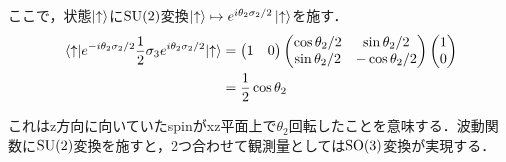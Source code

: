 ここで，状態$\ket{\uparrow}$に$\mathrm{SU}(2)$変換$\ket{\uparrow}\mapsto e^{i\theta_2 \sigma_2 /2}\ket{\uparrow} $を施す．
\begin{align}
		\mel{\uparrow}{e^{-i\theta_2\sigma_2 / 2}\frac{1}{2}\sigma_3e^{i\theta_2\sigma_2/2}}{\uparrow}
		&=
		\begin{pmatrix}
				1 & 0
		\end{pmatrix}
		\begin{pmatrix}
				\cos\theta_2 / 2 & \sin\theta_2 / 2\\
				\sin\theta_2 / 2 & -\cos\theta_2 / 2
		\end{pmatrix}
		\begin{pmatrix}
				1 \\
				0
		\end{pmatrix}
		\\
		&=
		\frac{1}{2}\cos\theta_2
\end{align}

これはz方向に向いていたspinがxz平面上で$\theta_2$回転したことを意味する．波動関数に$\mathrm{SU}(2)$変換を施すと，2つ合わせて観測量としては$\mathrm{SO}(3)$変換が実現する．

